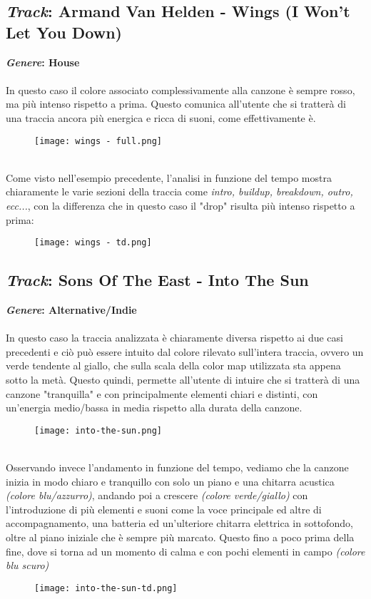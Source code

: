 \documentclass{article}
\begin{document}
\subsection{
    \textit{Track}: Armand Van Helden - Wings (I Won't Let You Down)
}
\textbf{\textit{Genere}: House}\\
\\
In questo caso il colore associato complessivamente alla canzone è sempre rosso, ma più intenso rispetto a prima. Questo comunica all'utente che si tratterà di una traccia ancora più energica e ricca di suoni, come effettivamente è.
\begin{figure}[h!]
    \centering
    \texttt{[image: wings - full.png]}
    \label{fig:armand-van-helden-full}
\end{figure}
\\
Come visto nell'esempio precedente, l'analisi in funzione del tempo mostra chiaramente le varie sezioni della traccia come \textit{intro, buildup, breakdown, outro, ecc...}, con la differenza che in questo caso il "drop" risulta più intenso rispetto a prima:
\begin{figure}[h]
    \centering
    \texttt{[image: wings - td.png]}
    \label{fig:armand-van-helden-td}
\end{figure}

\subsection{
    \textit{Track}: Sons Of The East - Into The Sun
}
\textbf{\textit{Genere}: Alternative/Indie}\\
\\
In questo caso la traccia analizzata è chiaramente diversa rispetto ai due casi precedenti e ciò può essere intuito dal colore rilevato sull'intera traccia, ovvero un verde tendente al giallo, che sulla scala della color map utilizzata sta appena sotto la metà. Questo quindi, permette all'utente di intuire che si tratterà di una canzone "tranquilla" e con principalmente elementi chiari e distinti, con un'energia medio/bassa in media rispetto alla durata della canzone.
\begin{figure}[h]
    \centering
    \texttt{[image: into-the-sun.png]}
    \label{fig:enter-label-full}
\end{figure}
\\
Osservando invece l'andamento in funzione del tempo, vediamo che la canzone inizia in modo chiaro e tranquillo con solo un piano e una chitarra acustica \textit{(colore blu/azzurro)}, andando poi a crescere \textit{(colore verde/giallo)} con l'introduzione di più elementi e suoni come la voce principale ed altre di accompagnamento, una batteria ed un'ulteriore chitarra elettrica in sottofondo, oltre al piano iniziale che è sempre più marcato. Questo fino a poco prima della fine, dove si torna ad un momento di calma e con pochi elementi in campo \textit{(colore blu scuro)}
\begin{figure}[h]
    \centering
    \texttt{[image: into-the-sun-td.png]}
    \label{fig:into-the-sun-td}
\end{figure}
\end{document}
